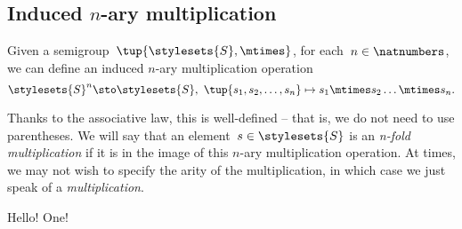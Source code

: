 \subsection{Induced $n$-ary multiplication}
Given a semigroup~$\tup{\stylesets{S}, \mtimes}$, for each~$n \in \natnumbers$, we can define an induced $n$-ary multiplication operation
\begin{equation*}
    \stylesets{S}^n \sto \stylesets{S}, \ \tup{s_1, s_2, \dots, s_n} \mapsto s_1 \mtimes s_2 \dots \mtimes s_n.
\end{equation*}


Thanks to the associative law, this is well-defined -- that is, we do not need to use parentheses.
We will say that an element~$s \in \stylesets{S}$ is an \emph{n-fold multiplication} if it is in the image of this $n$-ary multiplication operation.
At times, we may not wish to specify the arity of the multiplication, in which case we just speak of a \emph{multiplication}.


\showslides{\begin{forslides}
        \begin{equation}
            \label{eq:sg-mora}
            \mora
        \end{equation}
        \begin{equation}
            \label{eq:sg-morb}
            \morb
        \end{equation}
        \begin{equation}
            \label{eq:sg-morab}
            \mora\then\morb
        \end{equation}
    \end{forslides}
}

\clearpage
\pagestyle{scrheadings}
\thispagestyle{scrheadings}
\clearscrheadfoot
{}


Hello!
\clearpage
One!